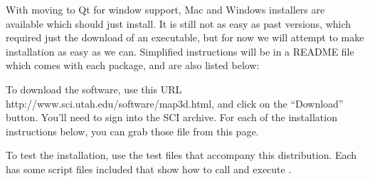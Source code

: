 With \map{} moving to Qt for window support, Mac and Windows installers
are available which should just install.  It is still not as easy
as past versions, which required just the download of an executable, but for
now we will attempt to make installation as easy as we can.  Simplified
instructions will be in a README file which comes with each package, and
are also listed below:

To download the software, use this URL
{http://www.sci.utah.edu/software/map3d.html}, and click on the
``Download'' button.  You'll need to sign into the SCI archive.  For
each of the installation instructions below, you can grab those file
from this page.


To test the installation, use the test files that accompany this
distribution.  Each has some script files included that show how to call
and execute \map{}.




%



